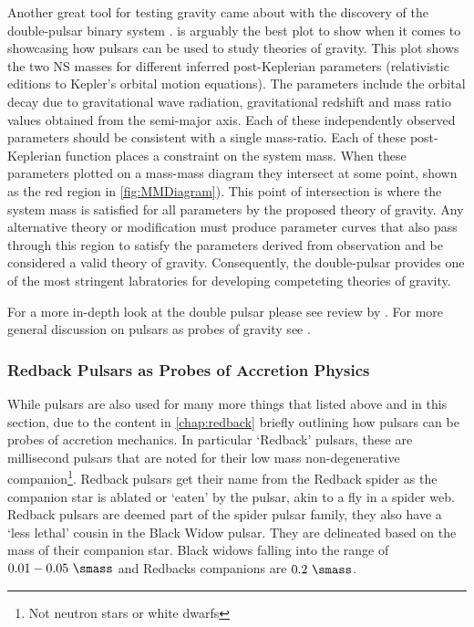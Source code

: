Another great tool for testing gravity came about with the discovery of the double-pulsar binary system \citep{burgay_increased_2003,lyne_double-pulsar_2004}.  is arguably the best plot to show when it comes to showcasing how pulsars can be used to study theories of gravity. This plot shows the two NS masses for different inferred post-Keplerian parameters (relativistic editions to Kepler's orbital motion equations). The parameters include the orbital decay due to gravitational wave radiation, gravitational redshift and mass ratio values obtained from the semi-major axis. Each of these independently observed parameters should be consistent with a single mass-ratio. Each of these post-Keplerian function places a constraint on the system mass. When these parameters plotted on a mass-mass diagram they intersect at some point, shown as the red region in \cref{fig:MMDiagram}). This point of intersection is where the system mass is satisfied for all parameters by the proposed theory of gravity. Any alternative theory or modification must produce parameter curves that also pass through this region to satisfy the parameters derived from observation and be considered a valid theory of gravity. Consequently, the double-pulsar provides one of the most stringent labratories for developing competeting theories of gravity. 

For a more in-depth look at the double pulsar please see review by \cite{kramer2021}. For more general discussion on pulsars as probes of gravity see \cite{kramer_pulsars_2016}. 

\subsubsection{Redback Pulsars as Probes of Accretion Physics}

While pulsars are also used for many more things that listed above and in this section, due to the content in \cref{chap:redback} briefly outlining how pulsars can be probes of accretion mechanics.  In particular `Redback' pulsars, these are millisecond pulsars that are noted for their low mass non-degenerative companion\footnote{Not neutron stars or white dwarfs}. Redback pulsars get their name from the Redback spider as the companion star is ablated or `eaten' by the pulsar, akin to a fly in a spider web. Redback pulsars are deemed part of the spider pulsar family, they also have a `less lethal' cousin in the Black Widow pulsar. They are delineated based on the mass of their companion star. Black widows falling into the range of $0.01-0.05~\smass$ and Redbacks companions are $0.2~\smass$. 

